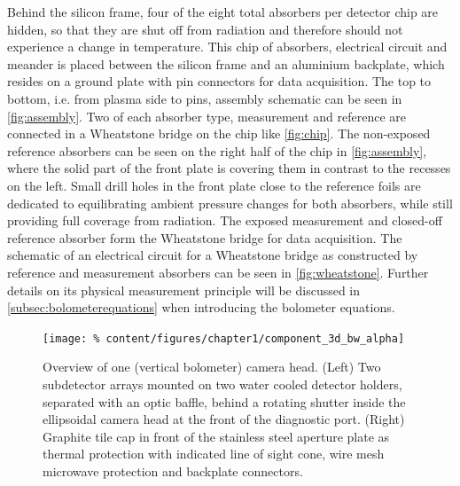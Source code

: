             Behind the silicon frame, four of the eight total absorbers per detector chip are hidden, so that they are shut off from radiation and therefore should not experience a change in temperature. This chip of absorbers, electrical circuit and meander is placed between the silicon frame and an aluminium backplate, which resides on a ground plate with pin connectors for data acquisition. The top to bottom, i.e. from plasma side to pins, assembly schematic can be seen in \cref{fig:assembly}. Two of each absorber type, measurement and reference are connected in a Wheatstone bridge on the chip like \cref{fig:chip}. The non-exposed reference absorbers can be seen on the right half of the chip in \cref{fig:assembly}, where the solid part of the front plate is covering them in contrast to the recesses on the left. Small drill holes in the front plate close to the reference foils are dedicated to equilibrating ambient pressure changes for both absorbers, while still providing full coverage from radiation. The exposed measurement and closed-off reference absorber form the Wheatstone bridge for data acquisition. The schematic of an electrical circuit for a Wheatstone bridge as constructed by reference and measurement absorbers can be seen in \cref{fig:wheatstone}. Further details on its physical measurement principle will be discussed in \cref{subsec:bolometerequations} when introducing the bolometer equations.\\%
%
            \begin{figure}[t]%
                \centering%
                \texttt{[image: \%
                    content/figures/chapter1/component\_3d\_bw\_alpha]}%
                \caption{%
                    Overview of one (vertical bolometer) camera head. (Left) Two subdetector arrays mounted on two water cooled detector holders, separated with an optic baffle, behind a rotating shutter inside the ellipsoidal camera head at the front of the diagnostic port. (Right) Graphite tile cap in front of the stainless steel aperture plate as thermal protection with indicated line of sight cone, wire mesh microwave protection and backplate connectors.}\label{fig:component_3D}%
            \end{figure}%
%
